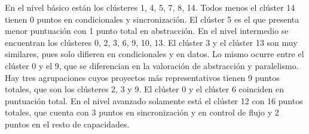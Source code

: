 \documentclass[a4paper, 12pt]{book}
\begin{document}
\begin{table}[H]
    \centering
    \caption{Puntuaciones de los proyectos representativos para el clustering con k=15}
    \label{table:representative_k15}
\end{table}

En el nivel básico están los clústeres 1, 4, 5, 7, 8, 14. Todos menos el clúster 14 tienen 0 puntos en condicionales y sincronización. El clúster 5 es el que presenta menor puntuación con 1 punto total en abstracción. 
En el nivel intermedio se encuentran los clústeres 0, 2, 3, 6, 9, 10, 13. El clúster 3 y el clúster 13 son muy similares, pues solo difieren en condicionales y en datos. Lo mismo ocurre entre el clúster 0 y el 9, que se diferencian en la valoración de abstracción y paralelismo. Hay tres agrupaciones cuyos proyectos más representativos tienen 9 puntos totales, que son los clústeres 2, 3 y 9. El clúster 0 y el clúster 6 coinciden en puntuación total. En el nivel avanzado solamente está el clúster 12 con 16 puntos totales, que cuenta con 3 puntos en sincronización y en control de flujo y 2 puntos en el resto de capacidades.
\end{document}
